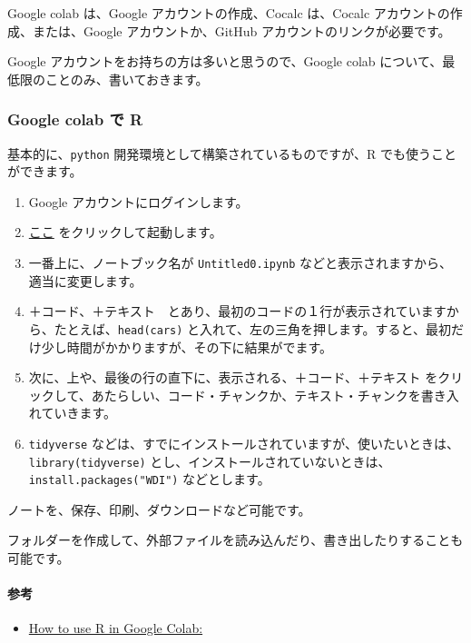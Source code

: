 \documentclass[
]{bxjsbook}
\providecommand{\tightlist}{%
  \setlength{\itemsep}{0pt}\setlength{\parskip}{0pt}}
\theoremstyle{definition}
\theoremstyle{definition}
\theoremstyle{definition}
\theoremstyle{definition}
\theoremstyle{remark}
\begin{document}
Google colab は、Google アカウントの作成、Cocalc は、Cocalc アカウントの作成、または、Google アカウントか、GitHub アカウントのリンクが必要です。

Google アカウントをお持ちの方は多いと思うので、Google colab について、最低限のことのみ、書いておきます。

\hypertarget{google-colab-ux3067-r}{%
\subsubsection{Google colab で R}\label{google-colab-ux3067-r}}

基本的に、\texttt{python} 開発環境として構築されているものですが、R でも使うことができます。

\begin{enumerate}
\def\labelenumi{\arabic{enumi}.}
\tightlist
\item
  Google アカウントにログインします。
\item
  \href{https://colab.research.google.com/\#create=true\&language=r}{ここ} をクリックして起動します。
\item
  一番上に、ノートブック名が \texttt{Untitled0.ipynb} などと表示されますから、適当に変更します。
\item
  ＋コード、＋テキスト　とあり、最初のコードの１行が表示されていますから、たとえば、\texttt{head(cars)} と入れて、左の三角を押します。すると、最初だけ少し時間がかかりますが、その下に結果がでます。
\item
  次に、上や、最後の行の直下に、表示される、＋コード、＋テキスト をクリックして、あたらしい、コード・チャンクか、テキスト・チャンクを書き入れていきます。
\item
  \texttt{tidyverse} などは、すでにインストールされていますが、使いたいときは、\texttt{library(tidyverse)} とし、インストールされていないときは、\texttt{install.packages("WDI")} などとします。
\end{enumerate}

ノートを、保存、印刷、ダウンロードなど可能です。

フォルダーを作成して、外部ファイルを読み込んだり、書き出したりすることも可能です。

\hypertarget{ux53c2ux8003}{%
\paragraph{参考}\label{ux53c2ux8003}}

\begin{itemize}
\tightlist
\item
  \href{https://towardsdatascience.com/how-to-use-r-in-google-colab-b6e02d736497}{How to use R in Google Colab:}
\end{itemize}
\end{document}
